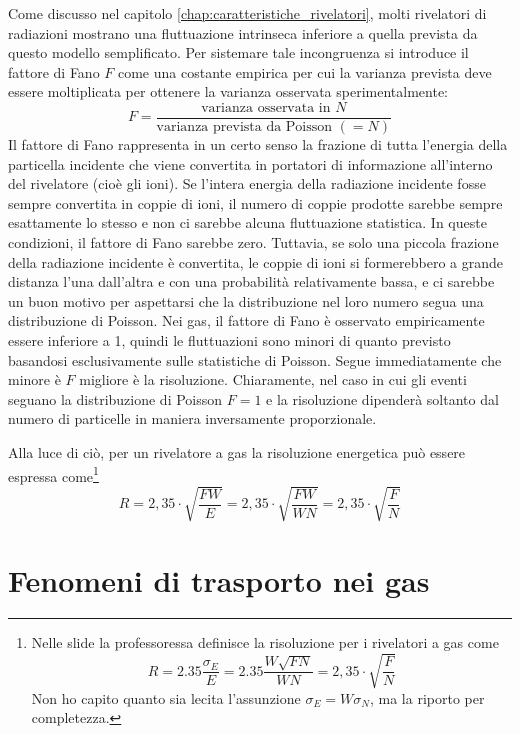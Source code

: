 Come discusso nel capitolo \ref{chap:caratteristiche_rivelatori}, molti rivelatori di radiazioni mostrano una fluttuazione intrinseca inferiore a quella prevista da questo modello semplificato. Per sistemare tale incongruenza si introduce il fattore di Fano $F$ come una costante empirica per cui la varianza prevista deve essere moltiplicata per ottenere la varianza osservata sperimentalmente:
\begin{equation*}
   F=\frac{\text{varianza osservata in $N$}}{\text{varianza prevista da Poisson $(=N)$}}
\end{equation*}
Il fattore di Fano rappresenta in un certo senso la frazione di tutta l'energia della particella incidente che viene convertita in portatori di informazione all'interno del rivelatore (cioè gli ioni). Se l'intera energia della radiazione incidente fosse sempre convertita in coppie di ioni, il numero di coppie prodotte sarebbe sempre esattamente lo stesso e non ci sarebbe alcuna fluttuazione statistica. In queste condizioni, il fattore di Fano sarebbe zero. Tuttavia, se solo una piccola frazione della radiazione incidente è convertita, le coppie di ioni si formerebbero a grande distanza l'una dall'altra e con una probabilità relativamente bassa, e ci sarebbe un buon motivo per aspettarsi che la distribuzione nel loro numero segua una distribuzione di Poisson. Nei gas, il fattore di Fano è osservato empiricamente essere inferiore a 1, quindi le fluttuazioni sono minori di quanto previsto basandosi esclusivamente sulle statistiche di Poisson. Segue immediatamente che minore è $F$ migliore è la risoluzione. Chiaramente, nel caso in cui gli eventi seguano la distribuzione di Poisson $F=1$ e la risoluzione dipenderà soltanto dal numero di particelle in maniera inversamente proporzionale.

Alla luce di ciò, per un rivelatore a gas la risoluzione energetica può essere espressa come\footnote{Nelle slide la professoressa definisce la risoluzione per i rivelatori a gas come
\begin{equation*}
   R
   =2.35\frac{\sigma_E}{E}
   =2.35\frac{W\sqrt{FN}}{WN}
   =2,35 \cdot \sqrt{\frac{F}{N}}
\end{equation*}
Non ho capito quanto sia lecita l'assunzione $\sigma_E=W\sigma_N$, ma la riporto per completezza.}
\begin{equation*}
   R
   =2,35 \cdot \sqrt{\frac{FW}{E}}
   =2,35 \cdot \sqrt{\frac{FW}{WN}}
   =2,35 \cdot \sqrt{\frac{F}{N}}
\end{equation*}

\section{Fenomeni di trasporto nei gas}


